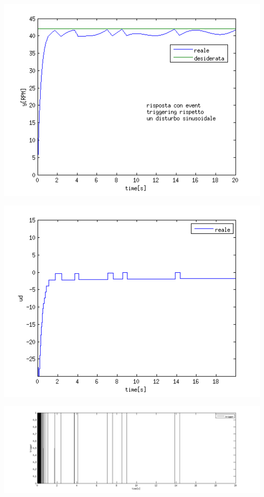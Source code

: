 \documentclass[a4paper,13pt]{article}
\begin{document}
\begin{center}
\includegraphics[scale=0.6]{graph/ydiscsin.png}
\end{center}
\begin{center}
\includegraphics[scale=0.6]{graph/udiscsin.png}
\end{center}
\begin{center}
\includegraphics[scale=0.4]{graph/trigger2.png}
\end{center}
\end{document}
